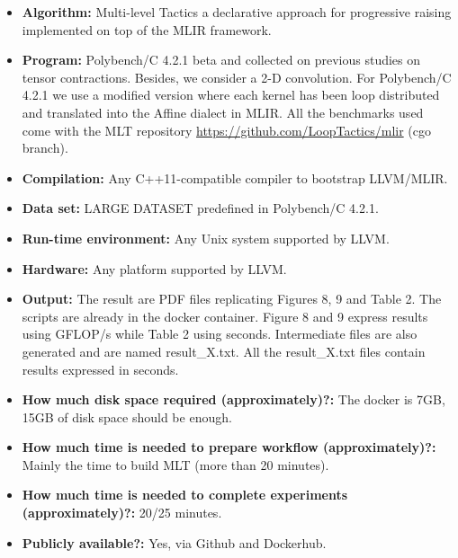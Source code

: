 {\small
\begin{itemize}
  \item {\bf Algorithm: } Multi-level Tactics a declarative approach for progressive
  raising implemented on top of the MLIR framework.
  \item {\bf Program: }Polybench/C 4.2.1 beta and collected on previous studies on tensor
  contractions. Besides, we consider a 2-D convolution. For Polybench/C 4.2.1 we use a modified version
  where each kernel has been loop distributed and translated into the Affine dialect
  in MLIR. All the benchmarks used come with the MLT repository \url{https://github.com/LoopTactics/mlir} (cgo branch).
  \item {\bf Compilation: }Any C++11-compatible compiler to bootstrap LLVM/MLIR.
  \item {\bf Data set: }LARGE DATASET predefined in Polybench/C 4.2.1.
  \item {\bf Run-time environment: } Any Unix system supported by LLVM.
  \item {\bf Hardware: }Any platform supported by LLVM.
  \item {\bf Output: }The result are PDF files replicating Figures 8, 9 and Table 2. The scripts are already in the docker container. Figure 8 and 9 express results using GFLOP/s while Table 2 using seconds. Intermediate files are also generated and are named result\_X.txt. All the result\_X.txt files contain results expressed in seconds.
  \item {\bf How much disk space required (approximately)?:} The docker is 7GB, 15GB of disk space should be enough.
  \item {\bf How much time is needed to prepare workflow (approximately)?: }Mainly the time to build MLT (more than 20 minutes).
  \item {\bf How much time is needed to complete experiments (approximately)?: }20/25 minutes.
  \item {\bf Publicly available?: }Yes, via Github and Dockerhub.
\end{itemize}

}
